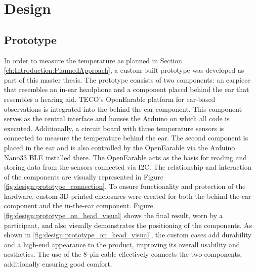 \chapter{Design}
\label{ch:Design}

\section{Prototype}
\label{ch:Design:Prototype}
In order to measure the temperature as planned in Section \ref{ch:Introduction:PlannedApproach}, a custom-built prototype was developed as part of this master thesis.
The prototype consists of two components: an earpiece that resembles an in-ear headphone and a component placed behind the ear that resembles a hearing aid. TECO's OpenEarable platform for ear-based observations is integrated into the behind-the-ear component. This component serves as the central interface and houses the Arduino on which all code is executed. Additionally, a circuit board with three temperature sensors is connected to measure the temperature behind the ear.
The second component is placed in the ear and is also controlled by the OpenEarable via the Arduino Nano33 BLE installed there. The OpenEarable acts as the basis for reading and storing data from the sensors connected via I2C. The relationship and interaction of the components are visually represented in Figure \ref{fig:design:prototype_connection}.
To ensure functionality and protection of the hardware, custom 3D-printed enclosures were created for both the behind-the-ear component and the in-the-ear component. 
Figure \ref{fig:design:prototype_on_head_visual} shows the final result, worn by a participant, and also visually demonstrates the positioning of the components.
As shown in \ref{fig:design:prototype_on_head_visual}, the custom cases add durability and a high-end appearance to the product, improving its overall usability and aesthetics.
The use of the 8-pin cable effectively connects the two components, additionally ensuring good comfort.

